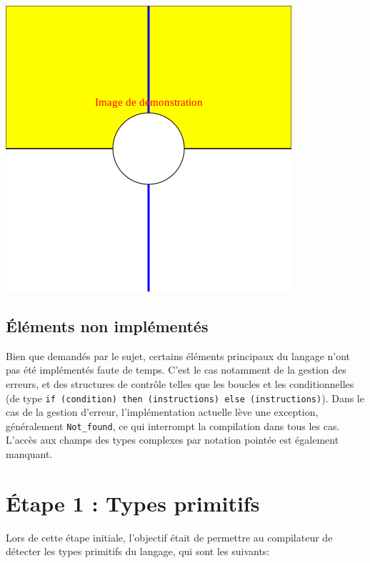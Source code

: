\documentclass[a4paper, 12pt]{report}
\begin{document}
	\includegraphics{demonstration.png}~\\
	
	\section{\'Eléments non implémentés}
	
	Bien que demandés par le sujet, certains éléments principaux du langage n'ont pas été implémentés faute de temps. C'est le cas notamment de la gestion des erreurs, et des structures de contrôle telles que les boucles et les conditionnelles (de type \texttt{if (condition) then (instructions) else (instructions)}). Dans le cas de la gestion d'erreur, l'implémentation actuelle lève une exception, généralement \texttt{Not\_found}, ce qui interrompt la compilation dans tous les cas. L'accès aux champs des types complexes par notation pointée est également manquant.

\chapter{\'Etape 1 : Types primitifs}
    
    Lors de cette étape initiale, l'objectif était de permettre au compilateur de détecter les types primitifs du langage, qui sont les suivants:\\
    
\end{document}
